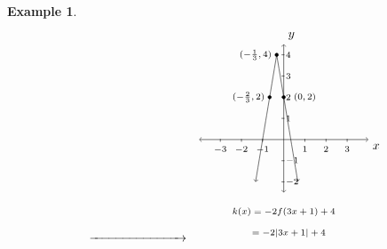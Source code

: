 \documentclass[12pt]{book}
\theoremstyle{definition}
\newtheorem{example}{Example}
\begin{document}
\begin{example}
\[\begin{array}{ccc}
&

\xrightarrow{\hspace{1in}} 

&

\begin{tikzpicture}[xscale=0.6,yscale=0.6]
	\draw [<->](-4,0) -- coordinate (x axis mid) (4,0) node[below right] {$x$};
	\draw [<->](0,-2.5) -- coordinate (x axis mid) (0,4.5) node[above right] {$y$};
	\draw [->] plot [domain=-0.333:0.667, samples=100] (\x,{-2*(3*\x+1)+4});
	\draw [<-] plot [domain=-1.333:-0.333, samples=100] (\x,{2*(3*\x+1)+4});
	\draw[fill] (-0.667,2) circle (0.08);
	\draw[fill] (-0.333,4) circle (0.08);
	\draw[fill] (0,2) circle (0.08);
	\foreach \x in {-3,...,-1}
	\draw (\x,1pt) -- (\x,-3pt)
	node[anchor=north] {\scriptsize $\x$};
	\foreach \x in {1,...,3}
	\draw (\x,1pt) -- (\x,-3pt)
	node[anchor=north] {\scriptsize $\x$};
	\foreach \y in {1,...,4}
	\draw (1pt,\y) -- (-3pt,\y) 
	node[anchor=west] {\scriptsize $\y$};
	\foreach \y in {-2,...,-1}
	\draw (1pt,\y) -- (-3pt,\y) 
	node[anchor=west] {\scriptsize $\y$};
	\draw (-1.667,2) node[] {\scriptsize $(-\frac{2}{3},2)$}; 
	\draw (-1.333,4) node[] {\scriptsize $(-\frac{1}{3},4)$}; 
	\draw (1,2) node[] {\scriptsize $(0,2)$}; 
	\draw (0,-3) node[below] {\scriptsize $k(x)=-2f(3x+1)+4$};  
	\draw (0,-4) node[below] {\scriptsize $\ \ \ =-2|3x+1|+4$};  
\end{tikzpicture}
\end{array}\]
\end{example}
\end{document}
